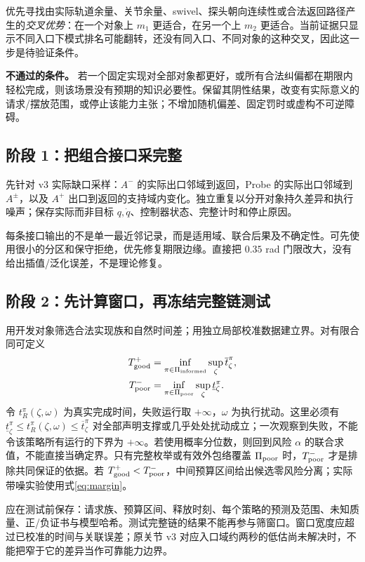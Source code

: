 \documentclass[11pt,a4paper,fontset=fandol]{ctexart}
\theoremstyle{definition}
\theoremstyle{remark}\newtheorem{remark}[theorem]{说明}
\numberwithin{equation}{section}
\begin{document}
优先寻找由实际轨道余量、关节余量、swivel、探头朝向连续性或合法返回路径产生的\emph{交叉优势}：在一个对象上 $m_1$ 更适合，在另一个上 $m_2$ 更适合。当前证据只显示不同入口下模式排名可能翻转，还没有同入口、不同对象的这种交叉，因此这一步是待验证条件。

\textbf{不通过的条件。} 若一个固定实现对全部对象都更好，或所有合法纠偏都在期限内轻松完成，则该场景没有预期的知识必要性。保留其阴性结果，改变有实际意义的请求/摆放范围，或停止该能力主张；不增加随机偏差、固定罚时或虚构不可逆障碍。

\subsection{阶段 1：把组合接口采完整}
先针对 v3 实际缺口采样：$A^-$ 的实际出口邻域到返回，Probe 的实际出口邻域到 $A^\pm$，以及 $A^+$ 出口到返回的支持域内变化。独立重复以分开对象持久差异和执行噪声；保存实际而非目标 $q,\dot q$、控制器状态、完整计时和停止原因。

每条接口输出的不是单一最近邻记录，而是适用域、联合后果及不确定性。可先使用很小的分区和保守拒绝，优先修复期限边缘。直接把 $0.35$ rad 门限改大，没有给出插值/泛化误差，不是理论修复。

\subsection{阶段 2：先计算窗口，再冻结完整链测试}
用开发对象筛选合法实现族和自然时间差；用独立局部校准数据建立界。对有限合同可定义
\begin{align}
 T_{\rm good}^+&=\inf_{\pi\in\Pi_{\rm informed}}
 \sup_\zeta\overline t_\zeta^\pi,\\
 T_{\rm poor}^-&=\inf_{\pi\in\Pi_{\rm poor}}
 \sup_\zeta\underline t_\zeta^\pi.
 \label{eq:window}
\end{align}
令 $t_R^\pi(\zeta,\omega)$ 为真实完成时间，失败运行取 $+\infty$，$\omega$ 为执行扰动。这里必须有 $\underline t_\zeta^\pi\le t_R^\pi(\zeta,\omega)\le\overline t_\zeta^\pi$ 对全部声明支撑或几乎处处扰动成立；一次观察到失败，不能令该策略所有运行的下界为 $+\infty$。若使用概率分位数，则回到风险 $\alpha$ 的联合求值，不能直接当确定界。只有完整枚举或有效外包络覆盖 $\Pi_{\rm poor}$ 时，$T_{\rm poor}^-$ 才是排除共同保证的依据。若 $T_{\rm good}^+<T_{\rm poor}^-$，中间预算区间给出候选零风险分离；实际带噪实验使用式\eqref{eq:margin}。

应在测试前保存：请求族、预算区间、释放时刻、每个策略的预测及范围、未知质量、正/负证书与模型哈希。测试完整链的结果不能再参与筛窗口。窗口宽度应超过已校准的时间与关联误差；原关节 v3 对应入口域约两秒的低估尚未解决时，不能把窄于它的差异当作可靠能力边界。
\end{document}
